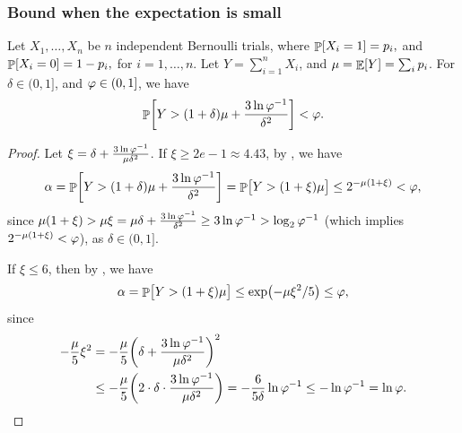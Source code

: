 
\subsubsection{Bound when the expectation is small}


\begin{lemma}
        Let $X_1, \ldots, X_n$ be $n$ independent Bernoulli trials, where
        \begin{math}
            \Prob{  X_i = 1 } =p_i,
        \end{math}
        and
        \begin{math}
            \Prob{  X_i = 0 } =1- p_i,
        \end{math}
        for $i=1,\ldots, n$.  Let $Y = \sum_{i=1}^{n} X_i$, and
        $\mu = \mathop{\mathbb{E}}\!\left[ { Y} \right] = \sum_i p_i$.  For $\delta \in (0,1]$, and
        $\varphi \in (0,1]$, we have
        \begin{equation*}
            \Prob{ \bigl. Y > (1+\delta)\mu + \frac{3\ln
                  \BadProb^{-1}}{\delta^2} }
            < \BadProb.
        \end{equation*}
\end{lemma}

\begin{proof}
    Let $\xi = \delta + \frac{3 \ln \varphi^{-1}}{\mu \delta^2}$.  If
    $\xi \geq 2e -1 \approx 4.43$, by , we
    have
    \begin{equation*}
        \alpha %
        =%
        \Prob{ \bigl. Y > (1+\delta)\mu + \frac{3\ln
              \BadProb^{-1}}{\delta^2} }%
        =%
        \Prob{ \bigl. Y > (1+\xi)\mu  }
        \leq%
        2^{-\mu ( 1+\xi)}
        <%
        \BadProb,
    \end{equation*}
    since
    $\mu(1+\xi) > \mu \xi = \mu\delta + \frac{3 \ln \varphi^{-1}}{\delta^2} \geq 3\ln
    \varphi^{-1} > \log_2 \varphi^{-1}$ (which implies
    $2^{-\mu(1+\xi)} < \varphi$), as $\delta \in (0,1]$.

    If $\xi \leq 6$, then by , we have
    \begin{equation*}
        \alpha%
        =%
        \Prob{ \bigl. Y > (1+\xi)\mu  }%
        \leq%
        \exp\pth{ - \mu \xi^2  / 5 }
        \leq %
        \BadProb,
    \end{equation*}
    since
    \begin{align*}
        - \frac{\mu}{5} \xi^2%
        &=%
        - \frac{\mu}{5} \pth{  \delta + \frac{3 \ln \BadProb^{-1}}{\mu
              \delta^2} }^2%
        \\&\leq%
        - \frac{\mu}{5} \pth{ 2 \cdot  \delta \cdot \frac{3 \ln \BadProb^{-1}}{\mu
              \delta^2} }%
        =%
        -\frac{6}{5\delta}\ln \BadProb^{-1}
        \leq%
        -\ln \BadProb^{-1}
        =%
        \ln \BadProb.
    \end{align*}
\end{proof}


